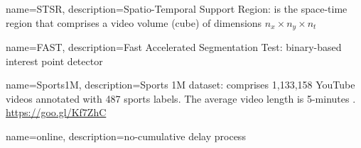 
{
        name={STSR},
        description={Spatio-Temporal Support Region: is the space-time region that comprises a video volume (cube) of dimensions $n_x \times n_y \times n_t$}
}

{
        name={FAST},
        description={Fast Accelerated Segmentation Test: binary-based interest point detector \cite{Rosten05}}
}


{
        name={Sports1M},
        description={Sports 1M dataset: comprises 1,133,158 YouTube videos annotated with 487 sports labels. The average video length is 5-minutes \cite{Karpathy14}. \\ \url{https://goo.gl/Kf7ZhC} }
}


{
        name={online},
        description={no-cumulative delay process}
}
















